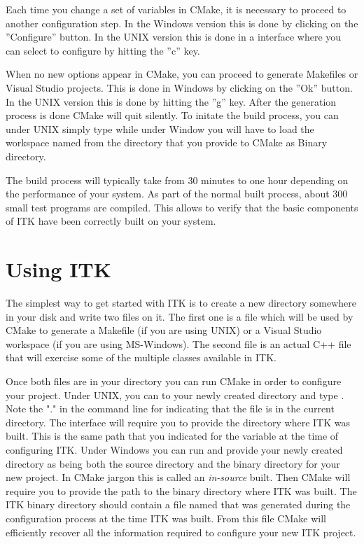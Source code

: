 Each time you change a set of variables in CMake, it is necessary to proceed to
another configuration step. In the Windows version this is done by clicking on
the ''Configure'' button. In the UNIX version this is done in a 
interface where you can select to configure by hitting the ''c'' key. 

When no new options appear in CMake, you can proceed to generate Makefiles or
Visual Studio projects. This is done in Windows by clicking on the ''Ok''
button.  In the UNIX version this is done by hitting the ''g'' key. After the
generation process is done CMake will quit silently. To initate the build
process, you can under UNIX simply type  while under Window you will
have to load the workspace named  from the directory that you
provide to CMake as Binary directory.

The build process will typically take from 30 minutes to one hour depending on
the performance of your system. As part of the normal built process, about 300
small test programs are compiled. This allows to verify that the basic
components of ITK have been correctly built on your system.


\section{Using ITK }
\label{sec:UsingITK}
 
The simplest way to get started with  ITK is to create a new directory
somewhere in your disk and write two files on it. The first one is a
 file which will be used by CMake to generate a Makefile
(if you are using UNIX) or a Visual Studio workspace (if you are using
MS-Windows).  The second file is an actual C++ file that will exercise some of
the multiple classes available in ITK.

Once both files are in your directory you can run CMake in order to configure
your project. Under UNIX, you can  to your newly created directory and
type . Note the "." in the command line for indicating that
the  file is in the current directory. The 
interface will require you to provide the directory where ITK was built. This
is the same path that you indicated for the  variable at
the time of configuring ITK. Under Windows you can run  and
provide your newly created directory as being both the source directory and the
binary directory for your new project. In CMake jargon this is called an
\emph{in-source} built. Then CMake will require you to provide the path to the
binary directory where ITK was built. The ITK binary directory should contain a
file named  that was generated during the configuration
process at the time ITK was built.  From this file CMake will efficiently
recover all the information required to configure your new ITK project.  


